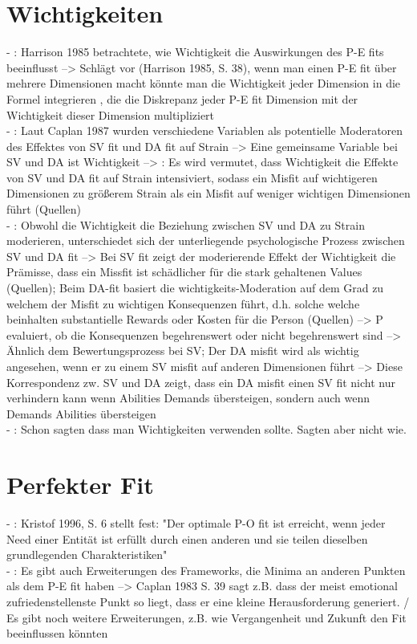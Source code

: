 \section{Wichtigkeiten}
\label{ch:personEnvironmentFit:wichtigkeiten}
- \cite[S. 23f.]{edwards:2008}: Harrison 1985 betrachtete, wie Wichtigkeit die Auswirkungen des P-E fits beeinflusst --> Schlägt vor (Harrison 1985, S. 38), wenn man einen P-E fit über mehrere Dimensionen macht könnte man die Wichtigkeit jeder Dimension in die Formel integrieren , die die Diskrepanz jeder P-E fit Dimension mit der Wichtigkeit dieser Dimension multipliziert \\
- \cite[S. 9]{edwards:1996}: Laut Caplan 1987 wurden verschiedene Variablen als potentielle Moderatoren des Effektes von SV fit und DA fit auf Strain --> Eine gemeinsame Variable bei SV und DA ist Wichtigkeit --> \cite[S. 10]{edwards:1996}: Es wird vermutet, dass Wichtigkeit die Effekte von SV und DA fit auf Strain intensiviert, sodass ein Misfit auf wichtigeren Dimensionen zu größerem Strain als ein Misfit auf weniger wichtigen Dimensionen führt (Quellen)\\
- \cite[S. 10]{edwards:1996}: Obwohl die Wichtigkeit die Beziehung zwischen SV und DA zu Strain moderieren, unterschiedet sich der unterliegende psychologische Prozess zwischen SV und DA fit --> Bei SV fit zeigt der moderierende Effekt der Wichtigkeit die Prämisse, dass ein Missfit ist schädlicher für die stark gehaltenen Values (Quellen); Beim DA-fit basiert die wichtigkeits-Moderation auf dem Grad zu welchem der Misfit zu wichtigen Konsequenzen führt, d.h. solche welche beinhalten substantielle Rewards oder Kosten für die Person (Quellen) --> P evaluiert, ob die Konsequenzen begehrenswert oder nicht begehrenswert sind --> Ähnlich dem Bewertungsprozess bei SV; Der DA misfit wird als wichtig angesehen, wenn er zu einem SV misfit auf anderen Dimensionen führt --> Diese Korrespondenz zw. SV und DA zeigt, dass ein DA misfit einen SV fit nicht nur verhindern kann wenn Abilities Demands übersteigen, sondern auch wenn Demands Abilities übersteigen \\
- \cite[S. 20f.]{edwards:2008}: Schon \textcite{copingAndAdaption:1974} sagten dass man Wichtigkeiten verwenden sollte. Sagten aber nicht wie.


\section{Perfekter Fit}
\label{ch:personEnvironmentFit:perfekterFit}
- \cite[S. 4]{edwards:2004}: Kristof 1996, S. 6 stellt fest: "Der optimale P-O fit ist erreicht, wenn jeder Need einer Entität ist erfüllt durch einen anderen und sie teilen dieselben grundlegenden Charakteristiken" \\
- \cite[S. 23]{edwards:2008}: Es gibt auch Erweiterungen des Frameworks, die Minima an anderen Punkten als dem P-E fit haben --> Caplan 1983 S. 39 sagt z.B. dass der meist emotional zufriedenstellenste Punkt so liegt, dass er eine kleine Herausforderung generiert. / Es gibt noch weitere Erweiterungen, z.B. wie Vergangenheit und Zukunft den Fit beeinflussen könnten \\



